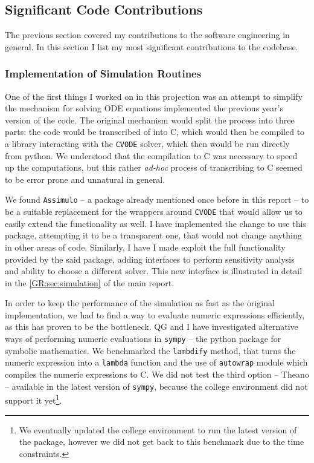 \subsection{Significant Code Contributions}

The previous section covered my contributions to the software engineering in general.
In this section I list my most significant contributions to the codebase.

\subsubsection{Implementation of Simulation Routines}

One of the first things I worked on in this projection was an attempt to simplify the mechanism for solving ODE equations implemented the previous year's version of the code. 
The original mechanism would split the process into three parts: the \python{} code would be transcribed of into C, which would then be compiled to a library interacting with the \verb"CVODE" solver\cite{hindmarsh_sundials_2005}, which then would be run directly from python.
We understood that the compilation to C was necessary to speed up the computations, but this rather \emph{ad-hoc} process of transcribing \py{} to C seemed to be error prone and unnatural in general.  

We found \verb"Assimulo" -- a package already mentioned once before in this report -- to be a suitable replacement for the wrappers around \verb"CVODE" that would allow us to easily extend the functionality as well. 
I have implemented the change to use this package, attempting it to be a transparent one, that would not change anything in other areas of code. Similarly, I have I made \means{} exploit the full functionality provided by the said package, adding interfaces to perform sensitivity analysis and ability to choose a different solver. 
This new interface is illustrated in detail in the \autoref*{GR:sec:simulation} of the main report.

In order to keep the performance of the simulation as fast as the original implementation, we had to find a way to evaluate numeric expressions efficiently, as this has proven to be the bottleneck. 
QG and I have investigated alternative ways of performing numeric evaluations in \verb"sympy" -- the python package for symbolic mathematics. We benchmarked the \verb"lambdify" method, that turns the numeric expression into a \verb"lambda" function and the use of  \verb"autowrap" module which compiles the numeric expressions to C.
We did not test the third option -- Theano\cite{bergstra_theano:_2010} -- available in the latest version of \verb"sympy", because the college environment did not support it yet\footnote{We eventually updated the college environment to run the latest version of the package, however we did not get back to this benchmark due to the time constraints.}.

